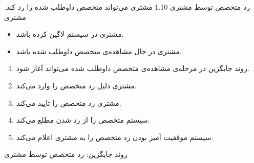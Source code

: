\alternativeflow
{
	رد متخصص توسط مشتری
}
{1.10}
{
	مشتری می‌تواند متخصص داوطلب شده را رد کند.
}
{
	مشتری
}
{}
{
	\begin{itemize}
		\vspace*{-0.6cm}
		\item 
		مشتری در سیستم لاگین کرده باشد.
		\item
		مشتری در حال مشاهده‌ی متخصص داوطلب شده باشد.
	\end{itemize}
}
{
	\vspace*{-0.6cm}
	\begin{enumerate}
		\item 
		روند جایگزین در مرحله‌ی مشاهده‌ی متخصص داوطلب شده می‌تواند آغاز شود.
		\item
		مشتری دلیل رد متخصص را وارد می‌کند.
		\item
		مشتری رد متخصص را تایید می‌کند.
		\item
		سیستم متخصص را از رد شدن مطلع می‌کند.
		\item
		سیستم موفقیت آمیز بودن رد متخصص را به مشتری اعلام می‌کند.
	\end{enumerate}
}
{
}
{
روند جایگزین: رد متخصص توسط مشتری
}


